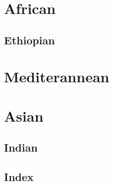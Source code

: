 \documentclass[oneside,11pt]{memoir} %
\begin{document}
\part{African}
\chapter{Ethiopian}

\part{Mediterannean}

\part{Asian}
\chapter{Indian}

\chapter*{Index}
\printindex
\end{document}
